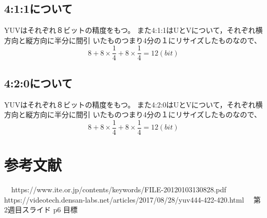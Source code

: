 \documentclass[a4j]{jsarticle}
\begin{document}
\subsection{4:1:1について}
YUVはそれぞれ８ビットの精度をもつ。
また4:1:1はUとVについて，それぞれ横方向と縦方向に半分に間引
いたものつまり4分の１にリサイズしたものなので、
\begin{equation*}
  8+8\times \frac{1}{4}+8\times \frac{1}{4}=12(bit)
\end{equation*}

\subsection{4:2:0について}
YUVはそれぞれ８ビットの精度をもつ。
また4:2:0はUとVについて，それぞれ横方向と縦方向に半分に間引
いたものつまり4分の１にリサイズしたものなので、
\begin{equation*}
  8+8\times \frac{1}{4}+8\times \frac{1}{4}=12(bit)
\end{equation*}

\section{参考文献}
\begin{thebibliography}{99}
  　https://www.ite.or.jp/contents/keywords/FILE-20120103130828.pdf
   https://videotech.densan-labs.net/articles/2017/08/28/yuv444-422-420.html
  　第2週目スライド p6 目標

\end{thebibliography}
\end{document}
